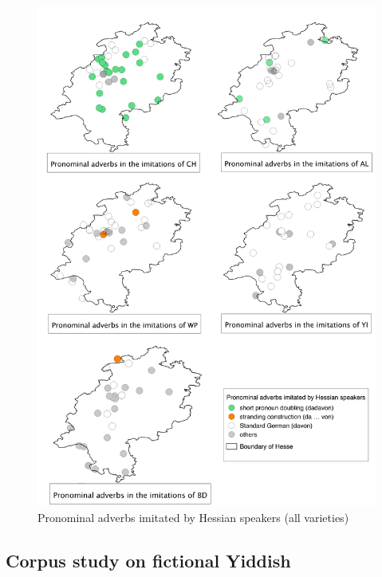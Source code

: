 \documentclass[output=paper]{LSP/langsci}
\begin{document}
\begin{figure}[h!]
\centering
\includegraphics[scale=0.49]{illustrations/schaf_etal_fig4}
		\caption{\label{diagramdadavonhessen} Pronominal adverbs imitated by Hessian speakers (all varieties)}
	\end{figure}
\FloatBarrier
 
	
\subsection{Corpus study on fictional Yiddish}\label{fiyi}
 
\end{document}

